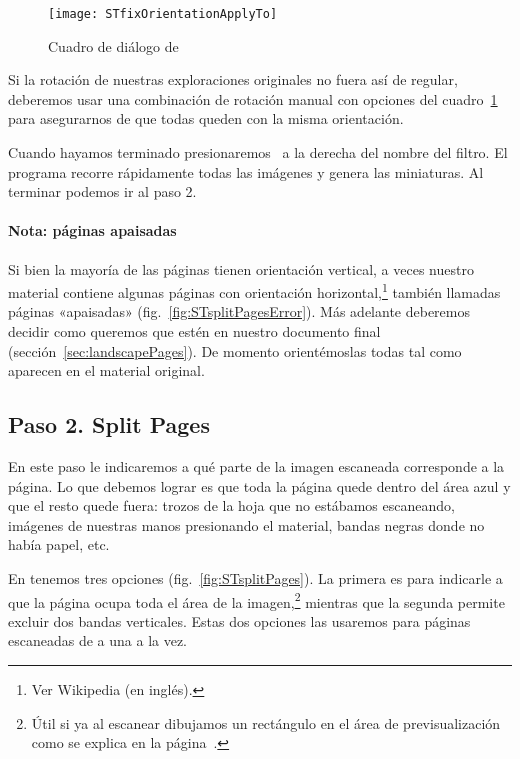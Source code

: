 \documentclass[%
	a5paper,
	10pt,
	twoside,
	openright,
	final,
]{memoir}
\begin{document}
{	\begin{figure}
		\centering
		\texttt{[image: STfixOrientationApplyTo]}
		\caption[Cuadro de diálogo \texttt{Apply to\...} de \scantailor]{Cuadro de diálogo  de \scantailor\label{fig:STfixOrientationApplyTo}}
	\end{figure}

	Si la rotación de nuestras exploraciones originales no fuera así de regular, deberemos usar una combinación de rotación manual con opciones del cuadro~\ref{fig:STfixOrientationApplyTo} para asegurarnos de que todas queden con la misma orientación.

	Cuando hayamos terminado presionaremos \play\ a la derecha del nombre del filtro. El programa recorre rápidamente todas las imágenes y genera las miniaturas. Al terminar podemos ir al paso 2.

	\paragraph{Nota: páginas apaisadas} Si bien la mayoría de las páginas tienen orientación vertical, a veces nuestro material contiene algunas páginas con orientación horizontal,\footnote{Ver Wikipedia \cite{WikipediaPageOrientation} (en inglés).} también llamadas páginas «apaisadas» (fig.~\ref{fig:STsplitPagesError}). Más adelante deberemos decidir como queremos que estén en nuestro documento final (sección~\ref{sec:landscapePages}). De momento orientémoslas todas tal como aparecen en el material original.

	\subsection{Paso 2. Split Pages\label{sec:STsplitPages}} En este paso le indicaremos a \scantailor qué parte de la imagen escaneada corresponde a la página. Lo que debemos lograr es que toda la página quede dentro del área azul y que el resto quede fuera: trozos de la hoja que no estábamos escaneando, imágenes de nuestras manos presionando el material, bandas negras donde no había papel, etc.

	En  tenemos tres opciones (fig.~\ref{fig:STsplitPages}). La primera es para indicarle a \scantailor que la página ocupa toda el área de la imagen,\footnote{Útil si ya al escanear dibujamos un rectángulo en el área de previsualización como se explica en la página~\pageref{pag:scanningRegionSelection}.} mientras que la segunda permite excluir dos bandas verticales. Estas dos opciones las usaremos para páginas escaneadas de a una a la vez.

}
\end{document}
